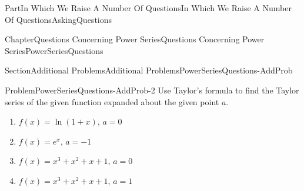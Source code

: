 \documentclass[oneside,10pt,]{book}
\numberwithin{equation}{part}
\begin{document}
\begin{partptx}{Part}{In Which We Raise A Number Of Questions}{}{In Which We Raise A Number Of Questions}{}{}{AskingQuestions}
\begin{chapterptx}{Chapter}{Questions Concerning Power Series}{}{Questions Concerning Power Series}{}{}{PowerSeriesQuestions}
%
\begin{sectionptx}{Section}{Additional Problems}{}{Additional Problems}{}{}{PowerSeriesQuestions-AddProb}
\begin{problem}{Problem}{}{PowerSeriesQuestions-AddProb-2}%
Use Taylor's formula to find the Taylor series of the given function expanded about the given point \(a\).%
\begin{enumerate}[font=\bfseries,label=(\alph*),ref=\alph*]%
\item{}\(f(x)=\ln\left(1+x\right)\), \(a=0\)%
\item{}\(f(x)=e^x\), \(a=-1\)%
\item{}\(f(x)=x^3+x^2+x+1\), \(a=0\)%
\item{}\(f(x)=x^3+x^2+x+1\), \(a=1\)%
\end{enumerate}%
\end{problem}
\end{sectionptx}
\end{chapterptx}
\end{partptx}
%
%
\typeout{************************************************}
\typeout{************************************************}
%
\end{document}
